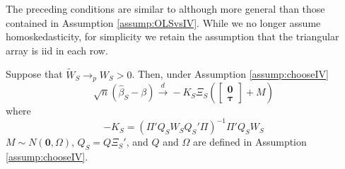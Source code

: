 The preceding conditions are similar to although more general than those contained in Assumption \ref{assump:OLSvsIV}. 
While we no longer assume homoskedasticity, for simplicity we retain the assumption that the triangular array is iid in each row. 

\begin{thm}
\label{thm:chooseIV} Suppose that $\widetilde{W}_S \rightarrow_p W_S >0$. Then, under Assumption \ref{assump:chooseIV}
$$\sqrt{n}\left(\widehat{\beta}_S - \beta \right) \overset{d}{\rightarrow} -K_S \Xi_S \left(\left[\begin{array}
           {c} \mathbf{0} \\ \boldsymbol{\tau}
         \end{array}\right] + M \right)$$
where
         $$-K_S = \left(\Pi' Q_S W_S Q_S'\Pi\right)^{-1} \Pi'Q_SW_S$$
$M \sim N(\mathbf{0}, \Omega)$, $Q_S = Q \Xi_S'$, and $Q$ and $\Omega$ are defined in Assumption \ref{assump:chooseIV}.
\end{thm}